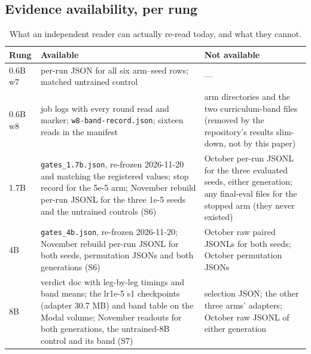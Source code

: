 \documentclass[11pt,a4paper]{article}
\begin{document}
\subsection*{Evidence availability, per rung}

\begin{table}[h]
\centering
\small
\caption{What an independent reader can actually re-read today, and what they cannot.}
\label{tab:s5c}
\begin{tabular}{@{}p{1.5cm}p{4.4cm}p{6.4cm}@{}}
\toprule
\textbf{Rung} & \textbf{Available} & \textbf{Not available} \\
\midrule
0.6B w7 & per-run JSON for all six arm--seed rows; matched untrained control & --- \\
0.6B w8 & job logs with every round read and marker; \texttt{w8-band-record.json};
sixteen reads in the manifest & arm directories and the two curriculum-band files (removed by the
repository's results slim-down, not by this paper) \\
1.7B & \texttt{gates\_1.7b.json}, re-frozen 2026-11-20 and matching the registered values; stop
record for the 5e-5 arm; November rebuild per-run JSONL for the three 1e-5 seeds and the untrained
controls (S6) & October per-run JSONL for the three evaluated seeds, either generation; any
final-eval files for the stopped arm (they never existed) \\
4B & \texttt{gates\_4b.json}, re-frozen 2026-11-20; November rebuild per-run JSONL for both seeds,
permutation JSONs and both generations (S6) & October raw paired JSONLs for both seeds; October
permutation JSONs \\
8B & verdict doc with leg-by-leg timings and band means; the lr1e-5 s1 checkpoints (adapter
30.7 MB) and band table on the Modal volume; November readouts for both generations, the untrained-8B
control and its band (S7) & selection JSON; the other three arms' adapters; October raw JSONL of
either generation \\
\bottomrule
\end{tabular}
\end{table}
\end{document}
